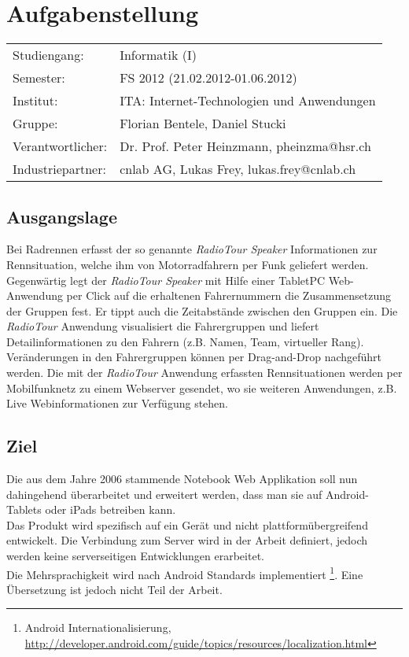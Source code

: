 \chapter*{Aufgabenstellung}

\begin{tabular}{ll}
Studiengang: & Informatik (I)\\
Semester: & FS 2012 (21.02.2012-01.06.2012)\\
Institut: & ITA: Internet-Technologien und Anwendungen\\
Gruppe: & Florian Bentele, Daniel Stucki\\
Verantwortlicher: & Dr. Prof. Peter Heinzmann, pheinzma@hsr.ch\\
Industriepartner: & cnlab AG, Lukas Frey, lukas.frey@cnlab.ch

\end{tabular}

\section*{Ausgangslage}
Bei Radrennen erfasst der so genannte \textit{RadioTour Speaker} Informationen zur Rennsituation, welche ihm von Motorradfahrern per Funk geliefert werden. Gegenwärtig legt der \textit{RadioTour Speaker} mit Hilfe einer TabletPC Web-Anwendung per Click auf die erhaltenen Fahrernummern die Zusammensetzung der Gruppen fest. Er tippt auch die Zeitabstände zwischen den Gruppen ein. Die \textit{RadioTour} Anwendung  visualisiert die Fahrergruppen und liefert Detailinformationen zu den Fahrern (z.B. Namen, Team, virtueller Rang). Veränderungen in den Fahrergruppen können per Drag-and-Drop nachgeführt werden. Die mit der \textit{RadioTour} Anwendung erfassten Rennsituationen werden per Mobilfunknetz zu einem Webserver gesendet, wo sie weiteren Anwendungen, z.B. Live Webinformationen zur Verfügung stehen.

\section*{Ziel}
Die aus dem Jahre 2006 stammende Notebook Web Applikation soll nun dahingehend überarbeitet und erweitert werden, dass man sie auf Android-Tablets oder iPads betreiben kann.
\\
Das Produkt wird spezifisch auf ein Gerät und nicht plattformübergreifend entwickelt. Die Verbindung zum Server wird in der Arbeit definiert, jedoch werden keine serverseitigen Entwicklungen erarbeitet.
\\
Die Mehrsprachigkeit wird nach Android Standards implementiert \footnote{Android Internationalisierung, \url{http://developer.android.com/guide/topics/resources/localization.html}}. Eine Übersetzung ist jedoch nicht Teil der Arbeit.
\newpage


